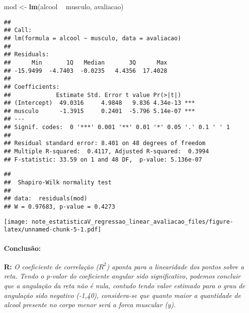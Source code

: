 \documentclass[]{article}
\newenvironment{Shaded}{\begin{snugshade}}{\end{snugshade}}
\newcommand{\KeywordTok}[1]{\textcolor[rgb]{0.13,0.29,0.53}{\textbf{#1}}}
\newcommand{\StringTok}[1]{\textcolor[rgb]{0.31,0.60,0.02}{#1}}
\newcommand{\OperatorTok}[1]{\textcolor[rgb]{0.81,0.36,0.00}{\textbf{#1}}}
\newcommand{\NormalTok}[1]{#1}
\let\oldparagraph\paragraph
\renewcommand{\paragraph}[1]{\oldparagraph{#1}\mbox{}}
\begin{document}
\begin{Shaded}
\begin{Highlighting}[]
\NormalTok{mod <-}\StringTok{ }\KeywordTok{lm}\NormalTok{(alcool }\OperatorTok{~}\StringTok{ }\NormalTok{musculo, avaliacao)}
\end{Highlighting}
\end{Shaded}

\begin{verbatim}
## 
## Call:
## lm(formula = alcool ~ musculo, data = avaliacao)
## 
## Residuals:
##      Min       1Q   Median       3Q      Max 
## -15.9499  -4.7403  -0.0235   4.4356  17.4028 
## 
## Coefficients:
##             Estimate Std. Error t value Pr(>|t|)    
## (Intercept)  49.0316     4.9848   9.836 4.34e-13 ***
## musculo      -1.3915     0.2401  -5.796 5.14e-07 ***
## ---
## Signif. codes:  0 '***' 0.001 '**' 0.01 '*' 0.05 '.' 0.1 ' ' 1
## 
## Residual standard error: 8.401 on 48 degrees of freedom
## Multiple R-squared:  0.4117, Adjusted R-squared:  0.3994 
## F-statistic: 33.59 on 1 and 48 DF,  p-value: 5.136e-07
\end{verbatim}

\begin{verbatim}
## 
##  Shapiro-Wilk normality test
## 
## data:  residuals(mod)
## W = 0.97683, p-value = 0.4273
\end{verbatim}

\texttt{[image: note\_estatisticaV\_regressao\_linear\_avaliacao\_files/figure-latex/unnamed-chunk-5-1.pdf]}

\paragraph{Conclusão:}\label{conclusao-1}

\textbf{R:} \emph{O coeficiente de correlação (\(R^2\)) aponta para a
linearidade dos pontos sobre a reta. Tendo o p-valor do coeficiente
angular sido significativo, podemos concluir que a angulação da reta não
é nula, contudo tendo valor estimado para o grau de angulação sido
negativo (-1,40), considera-se que quanto maior a quantidade de alcool
presente no corpo menor será a forca muscular (y).}
\end{document}
